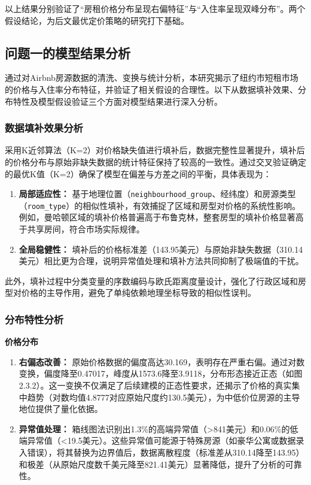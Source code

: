 \documentclass[12pt]{article}
\begin{document}
\begin{CJK}{UTF8}{gbsn}
	以上结果分别验证了“房租价格分布呈现右偏特征”与“入住率呈现双峰分布”。两个假设结论，为后文最优定价策略的研究打下基础。
	
	\subsection{问题一的模型结果分析}
	通过对Airbnb房源数据的清洗、变换与统计分析，本研究揭示了纽约市短租市场的价格与入住率分布特征，并验证了相关假设的合理性。以下从数据填补效果、分布特性及模型假设验证三个方面对模型结果进行深入分析。
	
	\subsubsection{数据填补效果分析}
	采用K近邻算法（K=2）对价格缺失值进行填补后，数据完整性显著提升，填补后的价格分布与原始非缺失数据的统计特征保持了较高的一致性。通过交叉验证确定的最优K值（K=2）确保了模型在偏差与方差之间的平衡，具体表现为：  
	\begin{enumerate}
		\item \textbf{局部适应性：} 基于地理位置（\texttt{neighbourhood\_group}、经纬度）和房源类型（\texttt{room\_type}）的相似性填补，有效捕捉了区域和房型对价格的系统性影响。例如，曼哈顿区域的填补价格普遍高于布鲁克林，整套房型的填补价格显著高于共享房间，符合市场实际规律。
		\item \textbf{全局稳健性：} 填补后的价格标准差（143.95美元）与原始非缺失数据（310.14美元）相比更为合理，说明异常值处理和填补方法共同抑制了极端值的干扰。
	\end{enumerate}
	此外，填补过程中分类变量的序数编码与欧氏距离度量设计，强化了行政区域和房型对价格的主导作用，避免了单纯依赖地理坐标导致的相似性误判。
	
	\subsubsection{分布特性分析}
	\textbf{价格分布}
	\begin{enumerate}
		\item \textbf{右偏态改善：} 原始价格数据的偏度高达30.169，表明存在严重右偏。通过对数变换，偏度降至0.47017，峰度从1573.6降至3.9118，分布形态接近正态（如图2.3.2）。这一变换不仅满足了后续建模的正态性要求，还揭示了价格的真实集中趋势（对数均值4.8777对应原始尺度约130.5美元），为中低价位房源的主导地位提供了量化依据。
		\item \textbf{异常值处理：} 箱线图法识别出1.3\%的高端异常值（>841美元）和0.06\%的低端异常值（<19.5美元）。这些异常值可能源于特殊房源（如豪华公寓或数据录入错误），将其替换为边界值后，数据离散程度（标准差从310.14降至143.95）和极差（从原始尺度数千美元降至821.41美元）显著降低，提升了分析的可靠性。
	\end{enumerate}
	

\end{CJK}
\end{document}
